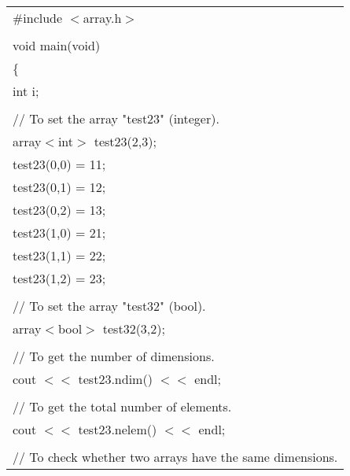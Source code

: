 {\small
\begin{center}
\begin{tabular}{|l|}\hline
\#include $<$array.h$>$\\
\hspace*{15cm}\\
void main(void)\\
\{\\
\hspace*{10mm}int i;\\
\\
\hspace*{10mm}// To set the array "test23" (integer).\\    
\hspace*{10mm}array$<$int$>$ test23(2,3);\\
\hspace*{10mm}test23(0,0) = 11;\\
\hspace*{10mm}test23(0,1) = 12;\\
\hspace*{10mm}test23(0,2) = 13;\\
\hspace*{10mm}test23(1,0) = 21;\\
\hspace*{10mm}test23(1,1) = 22;\\
\hspace*{10mm}test23(1,2) = 23;\\
\\
\hspace*{10mm}// To set the array "test32" (bool).\\
\hspace*{10mm}array$<$bool$>$ test32(3,2);\\
\\
\hspace*{10mm}// To get the number of dimensions.\\
\hspace*{10mm}cout $<<$ test23.ndim() $<<$ endl;\\
\\
\hspace*{10mm}// To get the total number of elements.\\
\hspace*{10mm}cout $<<$ test23.nelem() $<<$ endl;\\
\\
\hspace*{10mm}// To check whether two arrays have the same dimensions.\\

\end{tabular}
\end{center}}
